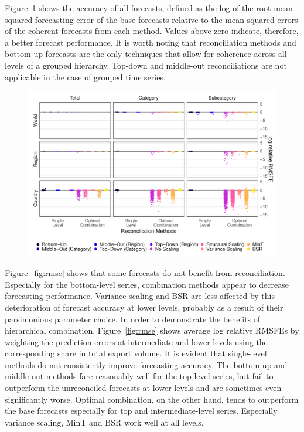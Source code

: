\documentclass[a4paper,fleqn,11pt]{article}
\begin{document}
Figure~\ref{fig:rmse_all} shows the accuracy of all forecasts, defined as the log of the root mean squared forecasting error of the base forecasts relative to the mean squared errors of the coherent forecasts from each method. Values above zero indicate, therefore, a better forecast performance. It is worth noting that reconciliation methods and bottom-up forecasts are the only techniques that allow for coherence across all levels of a grouped hierarchy. Top-down and middle-out reconciliations are not applicable in the case of grouped time series.

\begin{figure}[H]
	\includegraphics[width=\textwidth]{fig/fig_rmsfe_dots}
	\label{fig:rmse_all}
\end{figure}

Figure~\ref{fig:rmse} shows that some forecasts do not benefit from reconciliation. Especially for the bottom-level series, combination methods appear to decrease forecasting performance. Variance scaling and BSR are less affected by this deterioration of forecast accuracy at lower levels, probably as a result of their parsimonious parameter choice. In order to demonstrate the benefits of hierarchical combination, Figure~\ref{fig:rmse} shows average log relative RMSFEs by weighting the prediction errors at intermediate and lower levels using the corresponding share in total export volume. It is evident that single-level methods do not consistently improve forecasting accuracy. The bottom-up and middle out methods fare reasonably well for the top level series, but fail to outperform the unreconciled forecasts at lower levels and are sometimes even significantly worse. Optimal combination, on the other hand, tends to outperform the base forecasts especially for top and intermediate-level series. Especially variance scaling, MinT and BSR work well at all levels.
\end{document}
